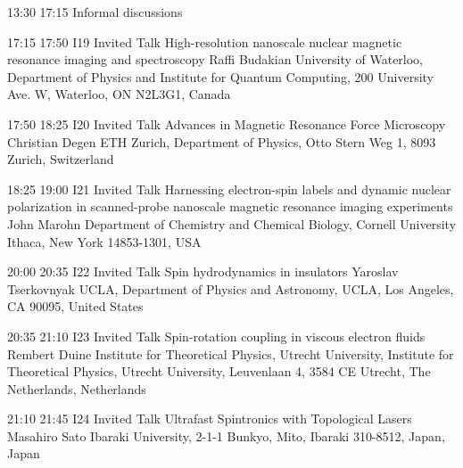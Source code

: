 \begin{confbreak}
{13:30}
{17:15}
{Informal discussions}
\end{confbreak}

 

\begin{talk}
{17:15}
{17:50}
{I19}
{Invited Talk}
{High-resolution nanoscale nuclear magnetic resonance imaging and spectroscopy}
{Raffi Budakian}
{University of Waterloo, Department of Physics and Institute for Quantum Computing, 200 University Ave. W, Waterloo, ON N2L3G1, Canada}
\end{talk}

\begin{talk}
{17:50}
{18:25}
{I20}
{Invited Talk}
{Advances in Magnetic Resonance Force Microscopy}
{Christian Degen}
{ETH Zurich, Department of Physics, Otto Stern Weg 1, 8093 Zurich, Switzerland}
\end{talk}

\begin{talk}
{18:25}
{19:00}
{I21}
{Invited Talk}
{Harnessing electron-spin labels and dynamic nuclear polarization in scanned-probe nanoscale magnetic resonance imaging experiments}
{John Marohn}
{Department of Chemistry and Chemical Biology, Cornell University Ithaca, New York 14853-1301, USA}
\end{talk}

 

\begin{talk}
{20:00}
{20:35}
{I22}
{Invited Talk}
{Spin hydrodynamics in insulators}
{Yaroslav Tserkovnyak}
{UCLA, Department of Physics and Astronomy, UCLA, Los Angeles, CA 90095, United States}
\end{talk}

\begin{talk}
{20:35}
{21:10}
{I23}
{Invited Talk}
{Spin-rotation coupling in viscous electron fluids}
{Rembert Duine}
{Institute for Theoretical Physics, Utrecht University, Institute for Theoretical Physics, Utrecht University, Leuvenlaan 4, 3584 CE Utrecht, The Netherlands, Netherlands}
\end{talk}

\begin{talk}
{21:10}
{21:45}
{I24}
{Invited Talk}
{Ultrafast Spintronics with Topological Lasers}
{Masahiro Sato}
{Ibaraki University, 2-1-1 Bunkyo, Mito, Ibaraki 310-8512, Japan, Japan}
\end{talk}

